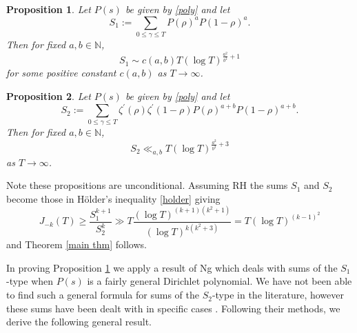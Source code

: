 \documentclass[oneside, 12pt]{amsart}
\newtheorem{prop}{Proposition}
\theoremstyle{definition}
\newcommand{\leqs}{\leqslant }
\newcommand{\geqs}{\geqslant }
\begin{document}
\begin{prop}
\label{S_1 prop} Let $P(s)$ be given by \eqref{poly} and let 
\[
S_1:= \sum_{0\leqs \gamma\leqs T} P(\rho)^{a}P(1-\rho)^{a}.
\]
Then for fixed $a,b\in\mathbb{N}$, 
\[
S_1\sim c(a,b) T(\log  T)^{\frac{a^2}{b^2}+1}
\]
for some positive constant $c(a,b)$ as $T\to\infty$.
\end{prop}

\begin{prop}
\label{S_2 prop}
Let $P(s)$ be given by \eqref{poly} and let 
\[
S_2:= \sum_{0\leqs \gamma\leqs T} \zeta^\prime(\rho)\zeta^\prime(1-\rho)P(\rho)^{a+b}P(1-\rho)^{a+b}.
\]
Then for fixed $a,b\in\mathbb{N}$, 
\[
S_2\ll_{a,b} T(\log  T)^{\frac{a^2}{b^2}+3}
\]
as $T\to\infty$.
\end{prop}



Note these propositions are unconditional. %
Assuming RH the sums $S_1$ and $S_2$ become those in H\"older's inequality \eqref{holder} giving
\[J_{-k}(T)\geqs \frac{S_1^{k+1}}{S_2^k}\gg  T \frac{(\log T)^{(k+1)(k^2+1)}}{(\log T)^{k(k^2+3)}}=T(\log T)^{(k-1)^2}\]
and Theorem \ref{main thm} follows.


In  proving Proposition \ref{S_1 prop} we apply a result of Ng \cite{Ng} which deals with sums of the $S_1$-type when $P(s)$ is a fairly general Dirichlet polynomial. We have not been able to find such a general formula for sums of the $S_2$-type in the literature, however these sums have been dealt with in specific cases \cite{HBB,CGG, CGGSimple, Ng1}. Following their methods, we derive the following general result. 
\end{document}
